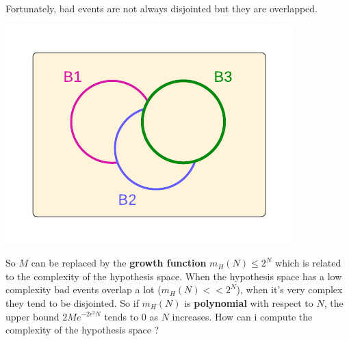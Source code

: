 Fortunately, bad events are not always disjointed but they are overlapped.
\begin{center}
    \includegraphics{images/Overlapped Sets.png}
\end{center}
So $M$ can be replaced by the \textbf{growth function} $m_{H}(N) \leq 2^{N}$ which is related to the complexity of the hypothesis space. When the hypothesis space has a low complexity bad events overlap a lot ($m_{H}(N) << 2^{N}$), when it's very complex they tend to be disjointed. So if $m_{H}(N)$ is \textbf{polynomial} with respect to $N$, the upper bound $2Me^{-2\epsilon^{2}N}$ tends to 0 as $N$ increases. How can i compute the complexity of the hypothesis space ?
